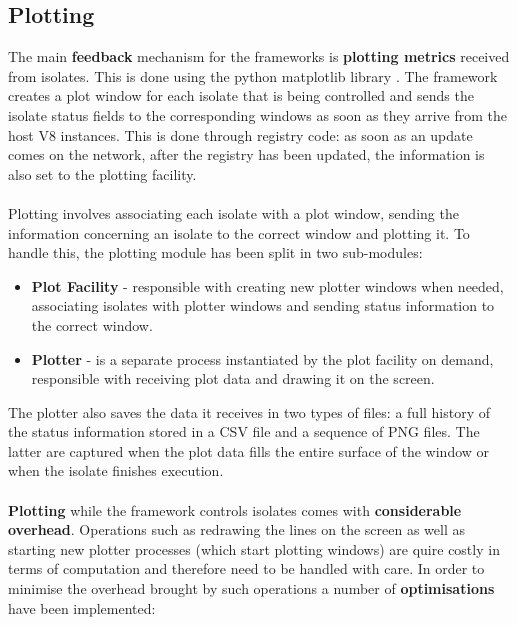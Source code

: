 \documentclass{l4proj}
\begin{document}
\subsection{Plotting}
\hspace*{1em} The main \textbf{feedback} mechanism for the frameworks is \textbf{plotting metrics} received from isolates. This is done using the python matplotlib library \cite{matplotlib}. The framework creates a plot window for each isolate that is being controlled and sends the isolate status fields to the corresponding windows as soon as they arrive from the host V8 instances. This is done through registry code: as soon as an update comes on the network, after the registry has been updated, the information is also set to the plotting facility.
\\\\
\hspace*{1em} Plotting involves associating each isolate with a plot window, sending the information concerning an isolate to the correct window and plotting it. To handle this, the plotting module has been split in two sub-modules:
\begin{itemize}
\item \textbf{Plot Facility} - responsible with creating new plotter windows when needed, associating isolates with plotter windows and sending status information to the correct window. 
\item \textbf{Plotter} - is a separate process instantiated by the plot facility on demand, responsible with receiving plot data and drawing it on the screen.
\end{itemize}
\hspace*{1em} The plotter also saves the data it receives in two types of files: a full history of the status information stored in a CSV file and a sequence of PNG files. The latter are captured when the plot data fills the entire surface of the window or when the isolate finishes execution.
\\\\
\hspace*{1em} \textbf{Plotting} while the framework controls isolates comes with \textbf{considerable overhead}. Operations such as redrawing the lines on the screen as well as starting new plotter processes (which start plotting windows) are quire costly in terms of computation and therefore need to be handled with care. In order to minimise the overhead brought by such operations a number of \textbf{optimisations} have been implemented:
\end{document}

